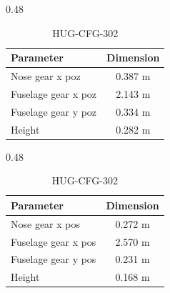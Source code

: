 \begin{table}[H]
    \centering
    \small
    \caption{Landing gear dimensions and observations}
    \label{tab:landing_gear_tradeoff}

    \begin{subtable}[t]{0.48\textwidth}
        \centering
        \caption{HUG-CFG-301}
        \begin{tabularx}{\linewidth}{|@{}X c@{}|}
            \hline
            \textbf{Parameter} & \textbf{Dimension}  \\
            \hline \hline
            Nose gear x poz & 0.387 m \\
            Fuselage gear x poz & 2.143 m \\
            Fuselage gear y poz & 0.334 m\\
            Height & 0.282 m\\
            \hline
        \end{tabularx}
    \end{subtable}
    \hfill
    \begin{subtable}[t]{0.48\textwidth}
        \centering
        \caption{HUG-CFG-302}
        \begin{tabularx}{\linewidth}{|@{}X c@{}|}
            \hline
            \textbf{Parameter} & \textbf{Dimension}  \\
            \hline \hline
            Nose gear x pos & 0.272 m \\
            Fuselage gear x pos & 2.570 m \\
            Fuselage gear y pos & 0.231 m\\
            Height & 0.168 m\\
            \hline
        \end{tabularx}
    \end{subtable}

    \vspace{0.5cm}


\end{table}
